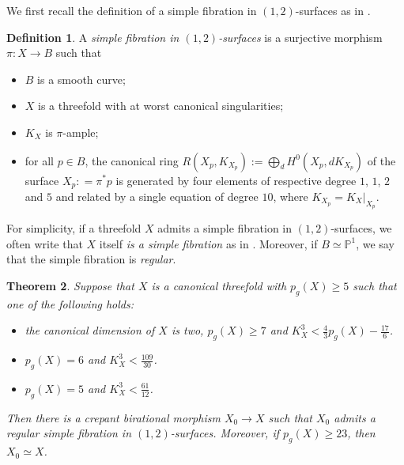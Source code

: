 \documentclass[a4paper,11pt]{amsart}
\newcommand{\PP}{\ensuremath{\mathbb{P}}}
\newtheorem{thm}{Theorem}[section]
\theoremstyle{definition}
\newtheorem{df}[thm]{Definition}
\theoremstyle{remark}
\numberwithin{equation}{section}
\begin{document}
We first recall the definition of a simple fibration in $(1,2)$-surfaces as in \cite[Definition 4.1]{CP}.
\begin{df}\label{def: simple fibration}
	A \emph{simple fibration in $(1,2)$-surfaces} is a surjective morphism
	$\pi \colon X \rightarrow B$
	such that
	\begin{itemize}
		\item [(i)] $B$ is a smooth curve;
		\item [(ii)] $X$ is a threefold with at worst canonical singularities;
		\item [(iii)] $K_X$ is $\pi$-ample;
		\item [(iv)] for all $p \in B$, the canonical ring $R(X_p, K_{X_p}):=\bigoplus_d H^0(X_p,dK_{X_p})$ of the surface $X_p: = \pi^{*} p$ is generated by four elements of respective degree $1$, $1$, $2$ and $5$ and related by a single equation of degree $10$, where $K_{X_p} = K_X|_{X_p}$.
	\end{itemize}
\end{df}

For simplicity, if a threefold $X$ admits a simple fibration in $(1,2)$-surfaces, we often write that $X$ itself \emph{is a simple fibration} as in \cite{CP}. Moreover, if $B \simeq \PP^1$, we say that the simple fibration is \emph{regular}.

\begin{thm} \label{thm: simple fibration}
	Suppose that $X$ is a canonical threefold with $p_g(X) \ge 5$ such that one of the following holds:
	\begin{itemize}
		\item [(1)] the canonical dimension of $X$ is two, $p_g(X) \ge 7$ and $K_X^3 < \frac{4}{3}p_g(X) - \frac{17}6$.
		\item [(2)] 
        $p_g(X) = 6$ and $K_X^3 < \frac{109}{30}$. 
        \item[(3)] $p_g(X) = 5$ and $K_X^3 < \frac{61}{12}$.
	\end{itemize}
	Then there is a crepant birational morphism $X_0 \to X$ such that $X_0$ admits a regular simple fibration in $(1,2)$-surfaces. Moreover, if $p_g(X) \ge 23$, then $X_0 \simeq X$.
\end{thm}
\end{document}
